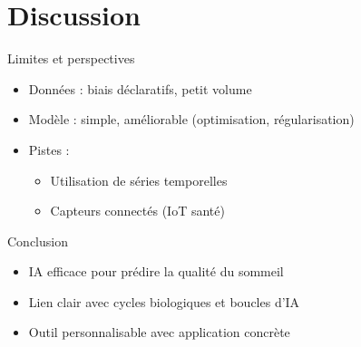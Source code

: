 \documentclass{beamer}
\begin{document}
\section{Discussion}

\begin{frame}{Limites et perspectives}
  \begin{itemize}
    \item Données : biais déclaratifs, petit volume
    \item Modèle : simple, améliorable (optimisation, régularisation)
    \item Pistes :
    \begin{itemize}
      \item Utilisation de séries temporelles
      \item Capteurs connectés (IoT santé)
    \end{itemize}
  \end{itemize}
\end{frame}

\begin{frame}{Conclusion}
  \begin{itemize}
    \item IA efficace pour prédire la qualité du sommeil
    \item Lien clair avec cycles biologiques et boucles d'IA
    \item Outil personnalisable avec application concrète
  \end{itemize}
  \vfill
\end{frame}
\end{document}
